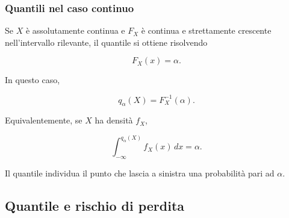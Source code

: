 \documentclass[handout]{beamer}%
\providecommand{\1}{\mathbf{1}}
\providecommand{\QTR}[2]{\csname #1\endcsname{#2}}
\begin{document}
\begin{frame}%
%

\frametitle{Quantili nel caso continuo}%


Se $X$ \`{e} assolutamente continua e $F_{X}$ \`{e} continua e strettamente
crescente nell'intervallo rilevante, il quantile si ottiene risolvendo%

\[
F_{X}(x)=\alpha.
\]


\medskip

In questo caso,%

\[
q_{\alpha}(X)=F_{X}^{-1}(\alpha).
\]


\medskip

Equivalentemente, se $X$ ha densit\`{a} $f_{X}$,%

\[
\int_{-\infty}^{q_{\alpha}(X)} f_{X}(x)\,dx=\alpha.
\]


\medskip

Il quantile individua il punto che lascia a sinistra una probabilit\`{a} pari
ad $\alpha$.%

\transboxout
\end{frame}%




\subsection{Quantile e rischio di perdita}%
\end{document}
